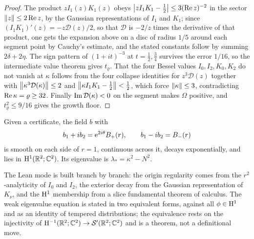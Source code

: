 \begin{proof}
  \leanok
  The product $zI_1(z)K_1(z)$ obeys $\left\lvert zI_1K_1-\tfrac12\right\rvert\leq3(\operatorname{Re} z)^{-2}$ in the
  sector $\left\|z\right\|\leq2\operatorname{Re} z$, by the Gaussian representations of $I_1$ and $K_1$; since
  $(I_1K_1)'(z)=-z\mathcal D(z)/2$, so that $\mathcal D$ is $-2/z$ times the derivative of
  that product, one gets the expansion above on a disc of radius $1/5$
  around each segment point by Cauchy's estimate, and the stated constants follow by
  summing $2\delta+2\eta$.  The sign pattern of $(1+it)^{-3}$ at $t=\tfrac12,\tfrac34$
  survives the error $1/16$, so the intermediate value theorem gives $t_\varrho$.  That the
  four Bessel values $I_0,I_2,K_0,K_2$ do not vanish at $\kappa$ follows from the four
  collapse identities for $z^3\mathcal D(z)$ together with
  $\left\|\kappa^3\mathcal D(\kappa)\right\|\leq2$ and $\left\|\kappa I_1K_1-\tfrac12\right\|<\tfrac12$,
  which force $\left\|\kappa\right\|\leq3$, contradicting $\operatorname{Re}\kappa=\varrho\geq32$.  Finally
  $\operatorname{Im}\mathcal D(\kappa)<0$ on the segment makes $\Omega$ positive, and
  $t_\varrho^2\leq9/16$ gives the growth floor.
\end{proof}

\begin{definition}
  \label{def:local:cartesian-mode}
  \leanok
  Given a certificate, the field $b$ with
  \[
    b_1+ib_2=\mathrm{e}^{2i\theta}B_+(r),\qquad b_1-ib_2=B_-(r)
  \]
  is smooth on each side of $r=1$, continuous across it, decays exponentially, and lies in
  $\mathrm{H}^1(\mathbb{R}^2;\mathbb{C}^2)$.  Its eigenvalue is $\lambda_*=\kappa^2-N^2$.
\end{definition}

The Lean mode is built branch by branch: the origin regularity comes from the
$r^2$-analyticity of $I_0$ and $I_2$, the exterior decay from the Gaussian representation
of $K_\nu$, and the $\mathrm{H}^1$ membership from a slice fundamental theorem of calculus.  The
weak eigenvalue equation is stated in two equivalent forms, against all
$\phi\in\mathrm{H}^1$ and as an identity of tempered distributions; the equivalence rests on the
injectivity of $\mathrm{H}^{-1}(\mathbb{R}^2;\mathbb{C}^2)\to\mathcal{S}'(\mathbb{R}^2;\mathbb{C}^2)$ and is a theorem, not a
definitional move.

